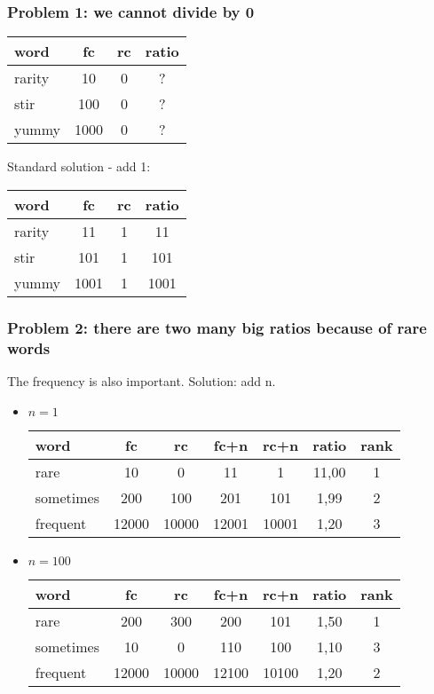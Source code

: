 \documentclass[svgnames]{beamer}
\begin{document}
\begin{frame}
  \frametitle{Problem 1:  we cannot divide by 0}
  \begin{tabular}[l]{lccc}
    word & fc & rc & ratio \\
    \hline
    rarity & 10 & 0 &  ? \\
    stir & 100 & 0 &  ? \\
    yummy & 1000 & 0 &  ? \\
  \end{tabular}
\end{frame}

\begin{frame}

Standard solution - add 1:
  \begin{tabular}[l]{lccc}
    word & fc & rc & ratio \\
    \hline
    rarity & 11 & 1 &  11 \\
    stir & 101 & 1 &  101 \\
    yummy & 1001 & 1 &  1001 \\
  \end{tabular}
\end{frame}

\begin{frame}
  \frametitle{Problem 2: there are two many big ratios because of rare words}
  The frequency is also important.   Solution: add n.

  \begin{itemize}
  \item $n=1$

  \begin{tabular}[l]{lcccccc}
    word & fc & rc & fc+n & rc+n & ratio & rank \\
    \hline
    rare & 10 & 0 & 11 & 1 & 11,00 & 1 \\
    sometimes & 200 & 100 & 201 & 101 & 1,99 & 2 \\
    frequent & 12000 & 10000 & 12001 & 10001 & 1,20 & 3 \\
  \end{tabular}
  
  \item $n=100$

  \begin{tabular}[l]{lcccccc}
    word & fc & rc & fc+n & rc+n & ratio & rank \\
    \hline
    rare & 200 & 300 & 200 & 101 & 1,50 & 1 \\
    sometimes & 10 & 0 & 110 & 100 & 1,10 &  3 \\
    frequent & 12000 & 10000 & 12100 & 10100 & 1,20 & 2 \\
  \end{tabular}

  \end{itemize}
  
\end{frame}
\end{document}
